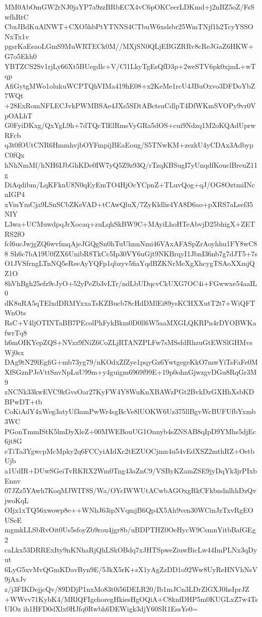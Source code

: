 MM0AbOmGW2rNJ0jaYP7a9zzBRbECX4vC6pOKCeerLDKmd+j2nBZ5oZ/FsSwfhRtC
CbzJBdKuAlNWT+CXO5hbPtYTNNS4CTbuW6xslsbr25WmTNjf1h2TcyYSSONxTx1v
pgsrKaEeaoLGmS9MuWRTECk0M//MXjSN0QLjEBGZRRv8cReJGaZ6HKW+G7o5Ekh0
YBTZCS2Sv1rjLy66Xt5BUegdlc+V/Cl1LkyTgEsQfD3p+2weSTV6pk0xjmL+wTqp
AfiGytgMWo1olukuWCPTQhVIMa419hE08+x2KeMe1rcU4JBuOxvo3DFDoYbZ7WQt
+28ExRomNFLECJvkPWMBSAe4JXs5SDtABctsuCdlpT4DfWKmSVOPy9vr0VpOALhT
G0FyiDKxg/QxYgL9h+7dTQcTlElRmsVyGRa5dOS+cui9Ndzq1M2oKQAdUprwRFcb
q3t0fOUtCNR6HmmhvjbOYFmpijBEaEoug/S5TNwKM+zezkU4yCDAx3AdbypC0fQx
hNhNmMf/hNH6IJbGhKDe0IW7yQ5Z9z93Q/rTzqKBSugI7yUnqdfKouclBreuZ11g
DiAqdibm/LqKFknU8N0qEyEmTO4HjOcYCpnZ+TLuvQog+qJ/OG8OztmiINcnIGP4
xVmYmCja9LSnSCbZKeVAD+tCAwQluX/7ZyKldlis4YA8D6ao+pXRS7aLsef35NIY
L3wa+UCMuwdpqJrXocaq+zuLqhSkBW9C+MAyiLhoHTeAbvjD25bhigX+ZETRS2fO
fcl6ucJwjgZQ6wvfmqAjeJGQgSn0hTuUhnnNmi46VAxAFASpZrAoyhhu1FY8wC88
Sh6c7bA19U0fZX6UnibR8TkCc5Ip30VY6uGjt9NKBrqyI1JbnI36nb7g7dJT5+7s
O1JVSfrngLTnNQ5eReeAyYQFp1qbzyv5fiaYqdBZKNrMeXgXhcygTSAoXXmjQZ1O
8hVhBgh25efz9cJyO+52yPeZb3vLTr/ndLbUDqcvCkUXG7OC4i+FGwwxe54aaIL0
dK8uRA5qTElxdDRMYxxaTsKZBucb78cHdDMlEi89ysKCHXXutT2t7+WiQFTWnOts
RsC+V4ljOTINTaBB7PEcolPhFykBkm0D0ll6W5aaMXGLQKRPn4rDYOBWKafwrTq8
h6mOIKYepZQS+NVzz9fNiZ6CoZLjRTANZPLFw7sMSsfdRhzuGtEWSlGHMvsWj0sx
DAg9tN29lEgfiG+mb73yg79/nKOdxZfZye1pqyGz6YwtgegeKkO7mwYiTsFaFe0M
XfSGznPJeVttSnvNpLuU99m+y4guigm6969f99E+19p0ohnGjwzgvDGu8RqGr3M9
zNCNk33kwEVC9kGvsOar27KyFW4Y8WuKnXBAWzPGt2BvkDzGXHhXsbKDBPwDT+tb
CoKiAdY4xWeg3atyUf3amPwWr4sgBcVe8lUOKW6Uz375llBgvWcBUFUfbYxmb3WC
PGonTmmIStK5lmDyXleZ+00MWEBouUG1Onnyb4sZNSAB8qIpD9YMhs5djEc6jt8G
eTiTa3YgwcpMcMpky2q6FCCyiAIdXc2tEZUOCjmn4u54vEdXSZ2mthRZ+OetbUjb
a1UdIR+DUwSGeiTvRKRX2Wm0Tng43aZnC9/VSByKZamZSE9jyDqYk3jrPIxbEnnv
07JZz5YAwh7KoqMJWIT8S/Wa/OYcIWWUtACwbAGOxgRkCFkbndnlhhDzQvjwoKqL
OIjx1xTQ56xwowp8e++WNhJ63ipNVqmjB6Qp4X5Ah9ven30WCinJzTxvRgEOUSeE
mgmkLLSbRvOit0Us5sfoyZb9rou4jgr8b/uBDPTHZ0OeHycW9CsmnYitbBafGEg2
caLkx53DRRExIty9nKNhaRjQhLSkOBdq7xJHTSpweZiuwBicLw44ImPLNx3qDyut
6LyG5xvMvQGmKDavByn9E/5JkX5rK+sX1yAgZzDD1o92Ww8UyReHNVhNsV9jAxJv
z/j3FIKDejjcQv/89DDjP1nxMo83t0i56DELR20/Ib1mJCn3LDrZlGXJ0hsIprJZ
+WWvv71KybK4/MRlQFIgehoregHkiesHgOQiA+C8knfDHP5m0KUGLxZ7w4TsUIOz
ih1HFD0dXlx0HJfq0Rwbh6DEWigk3djY60SR1EssYe0=
